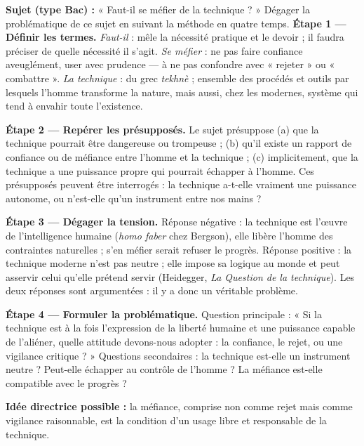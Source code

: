 \documentclass[11pt]{article}
\begin{document}
\begin{exoresolu}
\textbf{Sujet (type Bac) :} « Faut-il se méfier de la technique ? » Dégager la problématique de ce sujet en suivant la méthode en quatre temps.
\tcblower
\textbf{Étape 1 — Définir les termes.} \emph{Faut-il} : mêle la nécessité pratique et le devoir ; il faudra préciser de quelle nécessité il s'agit. \emph{Se méfier} : ne pas faire confiance aveuglément, user avec prudence — à ne pas confondre avec « rejeter » ou « combattre ». \emph{La technique} : du grec \emph{tekhnè} ; ensemble des procédés et outils par lesquels l'homme transforme la nature, mais aussi, chez les modernes, système qui tend à envahir toute l'existence.

\textbf{Étape 2 — Repérer les présupposés.} Le sujet présuppose (a) que la technique pourrait être dangereuse ou trompeuse ; (b) qu'il existe un rapport de confiance ou de méfiance entre l'homme et la technique ; (c) implicitement, que la technique a une puissance propre qui pourrait échapper à l'homme. Ces présupposés peuvent être interrogés : la technique a-t-elle vraiment une puissance autonome, ou n'est-elle qu'un instrument entre nos mains ?

\textbf{Étape 3 — Dégager la tension.} Réponse négative : la technique est l'œuvre de l'intelligence humaine (\emph{homo faber} chez Bergson), elle libère l'homme des contraintes naturelles ; s'en méfier serait refuser le progrès. Réponse positive : la technique moderne n'est pas neutre ; elle impose sa logique au monde et peut asservir celui qu'elle prétend servir (Heidegger, \emph{La Question de la technique}). Les deux réponses sont argumentées : il y a donc un véritable problème.

\textbf{Étape 4 — Formuler la problématique.} Question principale : « Si la technique est à la fois l'expression de la liberté humaine et une puissance capable de l'aliéner, quelle attitude devons-nous adopter : la confiance, le rejet, ou une vigilance critique ? » Questions secondaires : la technique est-elle un instrument neutre ? Peut-elle échapper au contrôle de l'homme ? La méfiance est-elle compatible avec le progrès ?

\textbf{Idée directrice possible :} la méfiance, comprise non comme rejet mais comme vigilance raisonnable, est la condition d'un usage libre et responsable de la technique.
\end{exoresolu}
\end{document}
